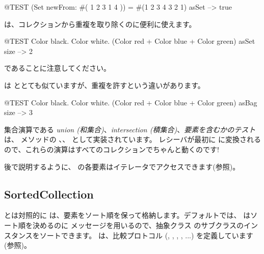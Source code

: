 \documentclass[a4paper,10pt,twoside]{book}
\begin{document}
\begin{code}{@TEST}
(Set newFrom: #( 1 2 3 1 4 )) = #(1 2 3 4 3 2 1) asSet --> true
\end{code}

 は、コレクションから重複を取り除くのに便利に使えます。
\begin{code}{@TEST}
{ Color black. Color white. (Color red + Color blue + Color green) } asSet size --> 2
\end{code}
\noindent
{} であることに注意してください。

 は  ととても似ていますが、重複を許すという違いがあります。
\begin{code}{@TEST}
{ Color black. Color white. (Color red + Color blue + Color green) } asBag size --> 3
\end{code}

集合演算である \emph{union (和集合)}、\emph{intersection (積集合)}、\emph{要素を含むかのテスト}は、 メソッドの 、、 として実装されています。
レシーバが最初に  に変換されるので、これらの演算はすべてのコレクションでちゃんと動くのです!


後で説明するように、 の各要素はイテレータでアクセスできます(参照)。

\subsection{SortedCollection}
 とは対照的に  は、要素をソート順を保って格納します。デフォルトでは、 はソート順を決めるのに  メッセージを用いるので、抽象クラス  のサブクラスのインスタンスをソートできます。 は、比較プロトコル (, , , , ...) を定義しています
(参照)。
\end{document}
